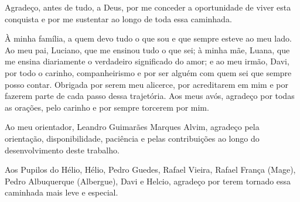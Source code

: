 Agradeço, antes de tudo, a Deus, por me conceder a oportunidade de viver
esta conquista e por me sustentar ao longo de toda essa caminhada.

À minha família, a quem devo tudo o que sou e que sempre esteve ao meu
lado. Ao meu pai, Luciano, que me ensinou tudo o que sei; à minha mãe,
Luana, que me ensina diariamente o verdadeiro significado do amor; e ao
meu irmão, Davi, por todo o carinho, companheirismo e por ser alguém com
quem sei que sempre posso contar. Obrigada por serem meu alicerce, por
acreditarem em mim e por fazerem parte de cada passo dessa trajetória.
Aos meus avós, agradeço por todas as orações, pelo carinho e por sempre
torcerem por mim.

Ao meu orientador, Leandro Guimarães Marques Alvim, agradeço pela
orientação, disponibilidade, paciência e pelas contribuições ao longo do
desenvolvimento deste trabalho.

Aos Pupilos do Hélio, Hélio, Pedro Guedes, Rafael Vieira, Rafael
França (Mage), Pedro Albuquerque (Albergue), Davi e Helcio,
agradeço por terem tornado essa caminhada mais leve e especial.
